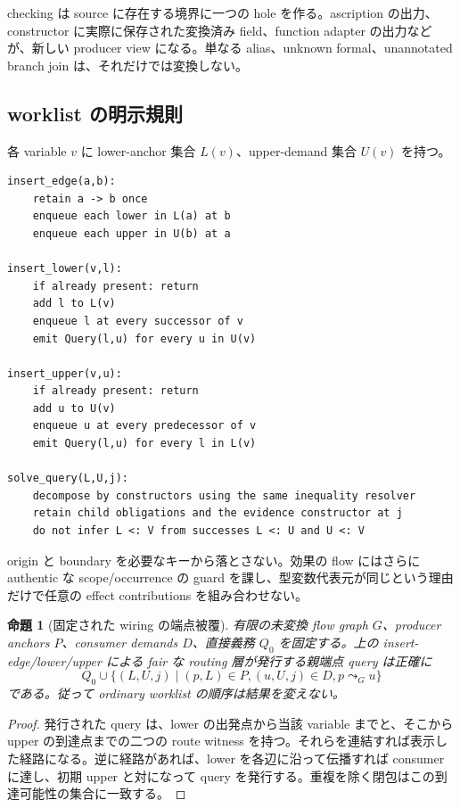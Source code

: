 \documentclass[11pt,a4paper]{article}
\newtheorem{theorem}{命題}[section]
\theoremstyle{remark}
\begin{document}
checking は source に存在する境界に一つの hole を作る。ascription の出力、constructor に実際に保存された変換済み field、function adapter の出力などが、新しい producer view になる。単なる alias、unknown formal、unannotated branch join は、それだけでは変換しない。

\subsection{worklist の明示規則}

各 variable $v$ に lower-anchor 集合 $L(v)$、upper-demand 集合 $U(v)$ を持つ。
\begin{Verbatim}[fontsize=\small]
insert_edge(a,b):
    retain a -> b once
    enqueue each lower in L(a) at b
    enqueue each upper in U(b) at a

insert_lower(v,l):
    if already present: return
    add l to L(v)
    enqueue l at every successor of v
    emit Query(l,u) for every u in U(v)

insert_upper(v,u):
    if already present: return
    add u to U(v)
    enqueue u at every predecessor of v
    emit Query(l,u) for every l in L(v)

solve_query(L,U,j):
    decompose by constructors using the same inequality resolver
    retain child obligations and the evidence constructor at j
    do not infer L <: V from successes L <: U and U <: V
\end{Verbatim}
origin と boundary を必要なキーから落とさない。効果の flow にはさらに authentic な scope/occurrence の guard を課し、型変数代表元が同じという理由だけで任意の effect contributions を組み合わせない。

\begin{theorem}[固定された wiring の端点被覆]
有限の未変換 flow graph $G$、producer anchors $P$、consumer demands $D$、直接義務 $Q_0$ を固定する。上の insert-edge/lower/upper による fair な routing 層が発行する親端点 query は正確に
\[
Q_0\cup\{(L,U,j)\mid(p,L)\in P, (u,U,j)\in D, p\leadsto_G u\}
\]
である。従って ordinary worklist の順序は結果を変えない。
\end{theorem}
\begin{proof}
発行された query は、lower の出発点から当該 variable までと、そこから upper の到達点までの二つの route witness を持つ。それらを連結すれば表示した経路になる。逆に経路があれば、lower を各辺に沿って伝播すれば consumer に達し、初期 upper と対になって query を発行する。重複を除く閉包はこの到達可能性の集合に一致する。
\end{proof}
\end{document}

